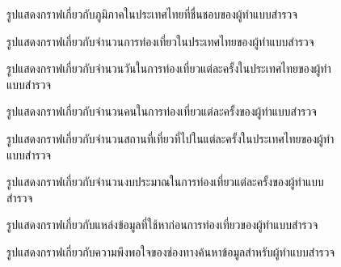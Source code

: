 \documentclass[12pt,oneside,openright,a4paper]{cpe-thai-project}
\begin{document}
\begin{figure}[!h]\centering
\setlength{\fboxrule}{0mm}
\caption{รูปแสดงกราฟเกี่ยวกับภูมิภาคในประเทศไทยที่ชื่นชอบของผู้ทำแบบสำรวจ}\label{fig:Fก.11}
\end{figure}

\begin{figure}[!h]\centering
\setlength{\fboxrule}{0mm}
\caption{รูปแสดงกราฟเกี่ยวกับจำนวนการท่องเที่ยวในประเทศไทยของผู้ทำแบบสำรวจ}\label{fig:Fก.12}
\end{figure}

\begin{figure}[!h]\centering
\setlength{\fboxrule}{0mm}
\caption{รูปแสดงกราฟเกี่ยวกับจำนวนวันในการท่องเที่ยวแต่ละครั้งในประเทศไทยของผู้ทำแบบสำรวจ}\label{fig:Fก.13}
\end{figure}

\begin{figure}[!h]\centering
\setlength{\fboxrule}{0mm}
\caption{รูปแสดงกราฟเกี่ยวกับจำนวนคนในการท่องเที่ยวแต่ละครั้งของผู้ทำแบบสำรวจ}\label{fig:Fก.14}
\end{figure}

\begin{figure}[!h]\centering
\setlength{\fboxrule}{0mm}
\caption{รูปแสดงกราฟเกี่ยวกับจำนวนสถานที่เที่ยวที่ไปในแต่ละครั้งในประเทศไทยของผู้ทำแบบสำรวจ}\label{fig:Fก.15}
\end{figure}

\begin{figure}[!h]\centering
\setlength{\fboxrule}{0mm}
\caption{รูปแสดงกราฟเกี่ยวกับจำนวนงบประมาณในการท่องเที่ยวแต่ละครั้งของผู้ทำแบบสำรวจ}\label{fig:Fก.16}
\end{figure}

\begin{figure}[!h]\centering
\setlength{\fboxrule}{0mm}
\caption{รูปแสดงกราฟเกี่ยวกับแหล่งข้อมูลที่ใช้หาก่อนการท่องเที่ยวของผู้ทำแบบสำรวจ}\label{fig:Fก.17}
\end{figure}

\begin{figure}[!h]\centering
\setlength{\fboxrule}{0mm}
\caption{รูปแสดงกราฟเกี่ยวกับความพึงพอใจของช่องทางค้นหาข้อมูลสำหรับผู้ทำแบบสำรวจ}\label{fig:Fก.18}
\end{figure}
\end{document}
